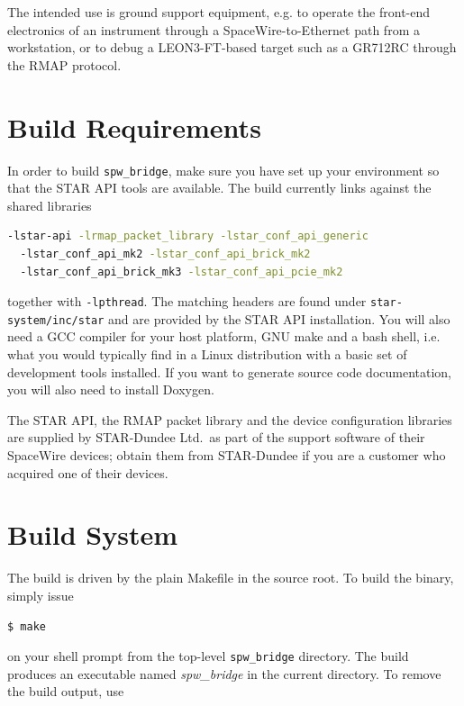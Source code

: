 The intended use is ground support equipment, e.g. to operate the front-end
electronics of an instrument through a \gls{SpaceWire}-to-Ethernet path from a
workstation, or to debug a \gls{LEON3-FT}-based target such as a
\gls{GR712RC} through the \gls{RMAP} protocol.

\section{Build Requirements}

In order to build \texttt{spw\_bridge}, make sure you have set up your
environment so that the STAR API tools are available. The build currently
links against the shared libraries

\begin{lstlisting}[language=bash]
  -lstar-api -lrmap_packet_library -lstar_conf_api_generic
  -lstar_conf_api_mk2 -lstar_conf_api_brick_mk2
  -lstar_conf_api_brick_mk3 -lstar_conf_api_pcie_mk2
\end{lstlisting}

\noindent
together with \texttt{-lpthread}. The matching headers are found under
\texttt{star-system/inc/star} and are provided by the STAR API installation.
You will also need a \gls{GCC} compiler for your host platform, GNU make and a
bash shell, i.e. what you would typically find in a Linux distribution with a
basic set of development tools installed. If you want to generate source code
documentation, you will also need to install \gls{Doxygen}.

\noindent
The \gls{STAR} API, the RMAP packet library and the device configuration
libraries are supplied by STAR-Dundee Ltd.\ as part of the support software of
their \gls{SpaceWire} devices; obtain them from STAR-Dundee if you are a
customer who acquired one of their devices.

\section{Build System}

The build is driven by the plain Makefile in the source root. To build the
binary, simply issue

\begin{lstlisting}[language=bash]
  $ make
\end{lstlisting}

\noindent
on your shell prompt from the top-level \texttt{spw\_bridge} directory. The
build produces an executable named \emph{spw\_bridge} in the current
directory. To remove the build output, use

